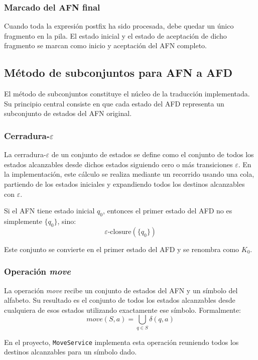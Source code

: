 \documentclass[12pt]{article}
\begin{document}
\subsubsection{Marcado del AFN final}

Cuando toda la expresión postfix ha sido procesada, debe quedar un único fragmento en la pila. El estado inicial y el estado de aceptación de dicho fragmento se marcan como inicio y aceptación del AFN completo.

\subsection{Método de subconjuntos para AFN a AFD}

El método de subconjuntos constituye el núcleo de la traducción implementada. Su principio central consiste en que cada estado del AFD representa un subconjunto de estados del AFN original.

\subsubsection{Cerradura-$\varepsilon$}

La cerradura-$\varepsilon$ de un conjunto de estados se define como el conjunto de todos los estados alcanzables desde dichos estados siguiendo cero o más transiciones $\varepsilon$. En la implementación, este cálculo se realiza mediante un recorrido usando una cola, partiendo de los estados iniciales y expandiendo todos los destinos alcanzables con $\varepsilon$.

Si el AFN tiene estado inicial $q_0$, entonces el primer estado del AFD no es simplemente $\{q_0\}$, sino:
\[
\varepsilon\text{-closure}(\{q_0\})
\]

Este conjunto se convierte en el primer estado del AFD y se renombra como $K_0$.

\subsubsection{Operación \textit{move}}

La operación \textit{move} recibe un conjunto de estados del AFN y un símbolo del alfabeto. Su resultado es el conjunto de todos los estados alcanzables desde cualquiera de esos estados utilizando exactamente ese símbolo. Formalmente:
\[
move(S, a) = \bigcup_{q \in S}\delta(q,a)
\]

En el proyecto, \texttt{MoveService} implementa esta operación reuniendo todos los destinos alcanzables para un símbolo dado.
\end{document}
